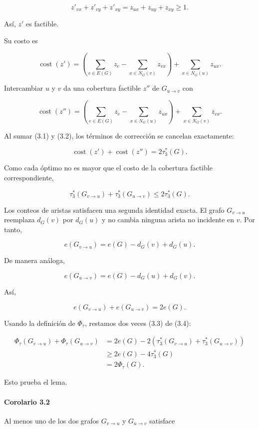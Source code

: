 \documentclass[
  spanish,
  11pt,
  a4paper,
]{article}
\begin{document}
\[
z'_{vx}+z'_{vy}+z'_{xy}
=
z_{ux}+z_{uy}+z_{xy}
\ge1.
\]

Así, \(z'\) es factible.

Su costo es

\[
\operatorname{cost}(z')
=
\left(
\sum_{e\in E(G)}z_e
-
\sum_{x\in N_G(v)}z_{vx}
\right)
+
\sum_{x\in N_G(u)}z_{ux}.
\tag{3.1}
\]

Intercambiar \(u\) y \(v\) da una cobertura factible \(z''\) de \(G_{u\to v}\) con

\[
\operatorname{cost}(z'')
=
\left(
\sum_{e\in E(G)}z_e
-
\sum_{x\in N_G(u)}z_{ux}
\right)
+
\sum_{x\in N_G(v)}z_{vx}.
\tag{3.2}
\]

Al sumar (3.1) y (3.2), los términos de corrección se cancelan exactamente:

\[
\operatorname{cost}(z')
+
\operatorname{cost}(z'')
=
2\tau_3^*(G).
\]

Como cada óptimo no es mayor que el costo de la cobertura factible correspondiente,

\[
\tau_3^*(G_{v\to u})
+
\tau_3^*(G_{u\to v})
\le
2\tau_3^*(G).
\tag{3.3}
\]

Los conteos de aristas satisfacen una segunda identidad exacta. El grafo \(G_{v\to u}\) reemplaza \(d_G(v)\) por \(d_G(u)\) y no cambia ninguna arista no incidente en \(v\). Por tanto,

\[
e(G_{v\to u})
=
e(G)-d_G(v)+d_G(u).
\]

De manera análoga,

\[
e(G_{u\to v})
=
e(G)-d_G(u)+d_G(v).
\]

Así,

\[
e(G_{v\to u})+e(G_{u\to v})=2e(G).
\tag{3.4}
\]

Usando la definición de \(\Phi_\tau\), restamos dos veces (3.3) de (3.4):

\[
\begin{aligned}
\Phi_\tau(G_{v\to u})
+
\Phi_\tau(G_{u\to v})
&=
2e(G)
-
2\left(
\tau_3^*(G_{v\to u})
+
\tau_3^*(G_{u\to v})
\right)\\
&\ge
2e(G)-4\tau_3^*(G)\\
&=
2\Phi_\tau(G).
\end{aligned}
\]

Esto prueba el lema.

\paragraph{Corolario 3.2}\label{corolario-3.2}

Al menos uno de los dos grafos \(G_{v\to u}\) y \(G_{u\to v}\) satisface
\end{document}
